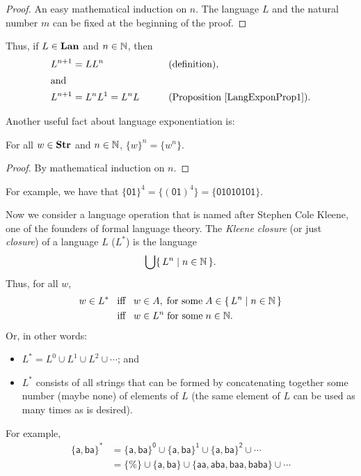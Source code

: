 \begin{proof}
An easy mathematical induction on $n$.  The language $L$ and the natural
number $m$ can be fixed at the beginning of the proof.
\end{proof}

Thus, if $L\in\mathbf{Lan}$ and $n\in\mathbb{N}$, then
\begin{alignat*}{2}
L^{n+1} &= LL^n && \qquad{\textrm{(definition)}}, \\
\intertext{and}
L^{n+1} &= L^nL^1 = L^nL && \qquad{\textrm{(Proposition~\ref{LangExponProp1})}} .
\end{alignat*}

Another useful fact about language exponentiation is:

\begin{proposition}
\label{LangExponProp2}
For all $w\in\mathbf{Str}$ and $n\in\mathbb{N}$, $\{w\}^n = \{w^n\}$.
\end{proposition}

\begin{proof}
By mathematical induction on $n$.
\end{proof}

For example, we have that $\{\mathsf{01}\}^4=\{(\mathsf{01})^4\}=
\{\mathsf{01010101}\}$.

Now we consider a language operation that is named after
Stephen Cole Kleene, one of the founders of formal language theory.
%
%
The \emph{Kleene closure} (or just \emph{closure}) of a language
$L$ ($L^*$) is the language
\begin{gather*}
\bigcup\{ \, L^n \mid n\in\mathbb{N} \, \}.
\end{gather*}
Thus, for all $w$,
\begin{align*}
w\in L^*&\mathrel{\;\;\allowbreak\mbox{iff}\allowbreak\;\;} w\in A,\;\allowbreak\mbox{for some}\allowbreak\;A\in\{ \, L^n \mid n\in\mathbb{N} \, \} \\
&\mathrel{\;\;\allowbreak\mbox{iff}\allowbreak\;\;} w\in L^n\;\allowbreak\mbox{for some}\allowbreak\;n\in\mathbb{N} .
\end{align*}
Or, in other words:
\begin{itemize}
\item $L^*=L^0\cup L^1\cup L^2\cup{\cdots}$; and

\item $L^*$ consists of all strings that can be formed by concatenating
together some number (maybe none) of elements of $L$ (the same element of
$L$ can be used as many times as is desired).
\end{itemize}
For example,
\begin{align*}
\mathsf{\{a,ba\}^*} &=
\mathsf{\{a,ba\}^0\cup\{a,ba\}^1\cup\{a,ba\}^2\cup\cdots} \\
&= \mathsf{\{\%\}\cup
   \{a,ba\}\cup
   \{aa,aba,baa,baba\}\cup\cdots}
\end{align*}

